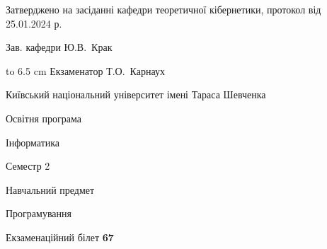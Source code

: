 \documentclass[12pt, ukrainian]{article}
\begin{document}
{\smallskip\smallskip \begin {scriptsize} Затверджено на засіданні кафедри теоретичної кібернетики, протокол   від   25.01.2024 р.\par\smallskip\smallskip\smallskip\smallskip
{\parbox {6.5 cm} {Зав. кафедри \dotfill Ю.В.~Крак}}\hspace {0.7cm} {\hbox to 6.5 cm { Екзаменатор \dotfill Т.О.~Карнаух}} \end{scriptsize}}
\newpage
{{\begin {scriptsize}\par
{ \center  Київський національний університет імені Тараса Шевченка \par}
{\parbox {5 cm}{Освітня програма \hfill}{\parbox {7 cm}{Інформатика\hfill}}\parbox {6 cm}{\hfill Семестр 2}}\par
{\parbox {5 cm} {Навчальний предмет \hfill}\parbox {7 cm}{Програмування \hfill}\parbox {6cm}{\hfill}\par}\vspace{-15pt} \end{scriptsize}}{\center Екзаменаційний білет \No \textbf { 67 }\par}}
\end{document}
